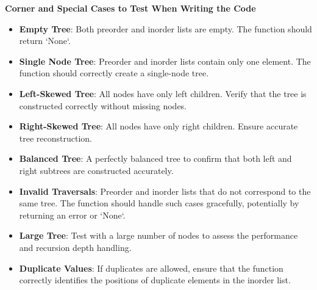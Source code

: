 \textbf{Corner and Special Cases to Test When Writing the Code}

\begin{itemize}
    \item \textbf{Empty Tree}: Both preorder and inorder lists are empty. The function should return `None`.
    \item \textbf{Single Node Tree}: Preorder and inorder lists contain only one element. The function should correctly create a single-node tree.
    \item \textbf{Left-Skewed Tree}: All nodes have only left children. Verify that the tree is constructed correctly without missing nodes.
    \item \textbf{Right-Skewed Tree}: All nodes have only right children. Ensure accurate tree reconstruction.
    \item \textbf{Balanced Tree}: A perfectly balanced tree to confirm that both left and right subtrees are constructed accurately.
    \item \textbf{Invalid Traversals}: Preorder and inorder lists that do not correspond to the same tree. The function should handle such cases gracefully, potentially by returning an error or `None`.
    \item \textbf{Large Tree}: Test with a large number of nodes to assess the performance and recursion depth handling.
    \item \textbf{Duplicate Values}: If duplicates are allowed, ensure that the function correctly identifies the positions of duplicate elements in the inorder list.
\end{itemize}